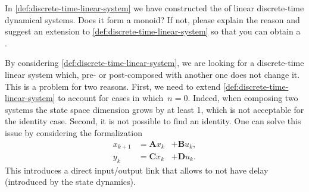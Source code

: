 \begin{exercise}
    In \cref{def:discrete-time-linear-system} we have constructed the  of linear discrete-time dynamical systems.
    Does it form a monoid?
    If not, please explain the reason and suggest an extension to \cref{def:discrete-time-linear-system} so that you can obtain a .
\end{exercise}
\begin{solution}
    By considering \cref{def:discrete-time-linear-system}, we are looking for a discrete-time linear system which, pre- or post-composed with another one does not change it.
    This is a problem for two reasons.
    First, we need to extend \cref{def:discrete-time-linear-system} to account for cases in which~$n=0$.
    Indeed, when composing two systems the state space dimension grows by at least 1, which is not acceptable for the identity case.
    Second, it is not possible to find an identity.
    One can solve this issue by considering the formalization
    \begin{equation}
        \label{eq:discrete-time-dynamics-D}
        \begin{aligned}
            x_{k+1} & =  \mathbf{A} x_k & + \mathbf{B} u_k, \\
            y_{k}   & =  \mathbf{C} x_k & + \mathbf{D} u_k.
        \end{aligned}
    \end{equation}
    This introduces a direct input/output link that allows to not have delay (introduced by the state dynamics).
\end{solution}

